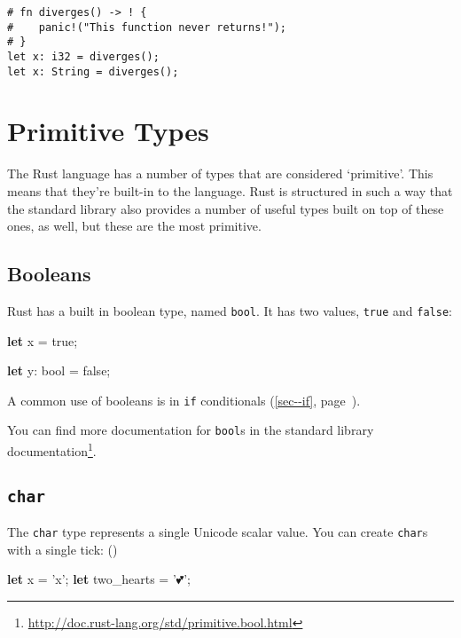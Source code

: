 \documentclass[a4paper,]{book}
\renewcommand*{\hyperref}[2][\ar]{%
  \def\ar{#2}%
  #2 (\autoref{#1}, page~\pageref{#1})}
\newenvironment{Shaded}{\begin{snugshade}}{\end{snugshade}}
\newcommand{\KeywordTok}[1]{\textcolor[rgb]{0.13,0.29,0.53}{\textbf{{#1}}}}
\newcommand{\DataTypeTok}[1]{\textcolor[rgb]{0.13,0.29,0.53}{{#1}}}
\newcommand{\ConstantTok}[1]{\textcolor[rgb]{0.00,0.00,0.00}{{#1}}}
\newcommand{\CharTok}[1]{\textcolor[rgb]{0.31,0.60,0.02}{{#1}}}
\newcommand{\NormalTok}[1]{{#1}}
\renewcommand{\href}[2]{#2\footnote{\url{#1}}}
\begin{document}
\begin{verbatim}
# fn diverges() -> ! {
#    panic!("This function never returns!");
# }
let x: i32 = diverges();
let x: String = diverges();
\end{verbatim}

\section{Primitive Types}\label{sec--primitive-types}

The Rust language has a number of types that are considered `primitive'.
This means that they're built-in to the language. Rust is structured in
such a way that the standard library also provides a number of useful
types built on top of these ones, as well, but these are the most
primitive.

\subsection{Booleans}\label{booleans}

Rust has a built in boolean type, named \texttt{bool}. It has two
values, \texttt{true} and \texttt{false}:

\begin{Shaded}
\begin{Highlighting}[]
\KeywordTok{let} \NormalTok{x = }\ConstantTok{true}\NormalTok{;}

\KeywordTok{let} \NormalTok{y: }\DataTypeTok{bool} \NormalTok{= }\ConstantTok{false}\NormalTok{;}
\end{Highlighting}
\end{Shaded}

A common use of booleans is in \hyperref[sec--if]{\texttt{if}
conditionals}.

You can find more documentation for \texttt{bool}s
\href{http://doc.rust-lang.org/std/primitive.bool.html}{in the standard
library documentation}.

\subsection{\texorpdfstring{\texttt{char}}{char}}\label{char}

The \texttt{char} type represents a single Unicode scalar value. You can
create \texttt{char}s with a single tick: (\texttt{\textquotesingle{}})

\begin{Shaded}
\begin{Highlighting}[]
\KeywordTok{let} \NormalTok{x = }\CharTok{'x'}\NormalTok{;}
\KeywordTok{let} \NormalTok{two_hearts = }\CharTok{'💕'}\NormalTok{;}
\end{Highlighting}
\end{Shaded}
\end{document}

